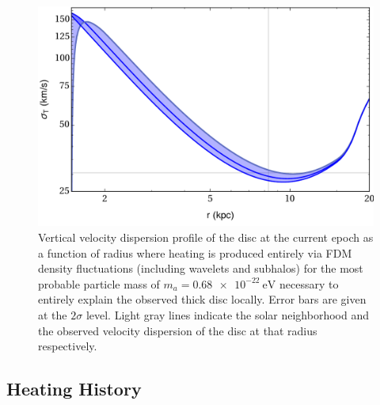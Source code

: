 \documentclass[usenatbib]{mnras}
\begin{document}
\begin{figure}
\includegraphics[width=\columnwidth]{heating_shape}
\vspace*{-5mm}
\caption{{\color{red} Vertical velocity dispersion profile of the disc at the current epoch as a function of radius where heating is produced entirely via FDM density fluctuations (including wavelets and subhalos) for the most probable particle mass of $m_{a} = \SI{0.68 e-22}{\electronvolt}$ necessary to entirely explain the observed thick disc locally. Error bars are given at the $2 \sigma$ level. Light gray lines indicate the solar neighborhood and the observed velocity dispersion of the disc at that radius respectively.} }
\label{fig:heating_shape}
\end{figure}

\subsection{Heating History}
\label{section:heating_histories}
\end{document}
